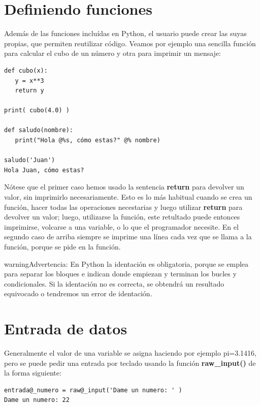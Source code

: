\documentclass[letterpaper,10pt,spanish]{sphinxmanual}
\begin{document}
\section{Definiendo funciones}
\label{ejecutables:definiendo-funciones}
Además de las funciones incluídas en Python, el usuario puede crear las suyas propias, que permiten reutilizar código. Veamos por ejemplo una sencilla función para calcular el cubo de un número y otra para imprimir un mensaje:

\begin{Verbatim}[commandchars=@\[\]]
def cubo(x):
   y = x**3
   return y

print( cubo(4.0) )

def saludo(nombre):
   print("Hola @%s, cómo estas?" @% nombre)

saludo('Juan')
Hola Juan, cómo estas?
\end{Verbatim}

Nótese que el primer caso hemos usado la sentencia \textbf{return} para devolver un valor, sin imprimirlo necesariamente. Esto es lo más habitual cuando se crea un función, hacer todas las operaciones necestarias y luego utilizar \textbf{return} para devolver un valor; luego, utilizarse la función, este retultado puede entonces imprimirse, volcarse a una variable, o lo que el programador necesite. En el segundo caso de arriba siempre se imprime una línea cada vez que se llama a la función, porque se pide en la función.

\begin{notice}{warning}{Advertencia:}
En Python la identación es obligatoria, porque se emplea para separar los bloques e indican donde empiezan y terminan los bucles y condicionales. Si la identación no es correcta, se obtendrá un resultado equivocado o tendremos un error de identación.
\end{notice}


\section{Entrada de datos}
\label{ejecutables:entrada-de-datos}
Generalmente el valor de una variable se asigna haciendo por ejemplo pi=3.1416, pero se puede pedir una entrada por teclado usando la función \textbf{raw\_input()} de la forma siguiente:

\begin{Verbatim}[commandchars=@\[\]]
entrada@_numero = raw@_input('Dame un numero: ' )
Dame un numero: 22
\end{Verbatim}
\end{document}
